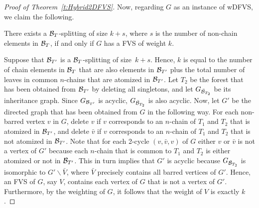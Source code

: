 \begin{proof}[Proof of Theorem~\ref{t:Hybrid2DFVS}]
Now, regarding $G$ as an instance of {\sc wDFVS}, we claim the following.

 There exists a ${\mathcal B}_T$-splitting of size $k+s$, where $s$ is the number of non-chain elements in ${\mathcal B}_T$, if and only if $G$ has a FVS of weight $k$.

{Suppose that ${\mathcal B}_{T'}$ is a ${\mathcal B}_T$-splitting of size~$k+s$. Hence, $k$ is equal to the number of chain elements in ${\mathcal B}_T$ that are also elements in ${\mathcal B}_{T'}$ plus the total number of leaves in common $n$-chains that are atomized in ${\mathcal B}_{T'}$. Let ${T_2}$ be the forest that has been obtained from ${\mathcal B}_{T'}$ by deleting all singletons, and let $G_{\bar{{\mathcal B}}_{T_2}}$ be its inheritance graph. Since $G_{{\mathcal B}_{T'}}$ is acyclic, $G_{\bar{{\mathcal B}}_{T_2}}$ is also acyclic. Now, let $G'$ be the directed graph that has been obtained from $G$ in the following way. For each non-barred vertex $v$ in $G$, delete $v$ if $v$ corresponds to an $n$-chain of $T_1$ and $T_2$ that is atomized in ${\mathcal B}_{T'}$, and delete $\bar{v}$ if $v$ corresponds to an $n$-chain of $T_1$ and $T_2$ that is not atomized in ${\mathcal B}_{T'}$}. Note that for each 2-cycle $(v,\bar{v},v)$ of $G$ either $v$ or $\bar{v}$ is not a vertex of $G'$ because each $n$-chain that is common to $T_1$ and $T_2$ is either atomized or not in ${\mathcal B}_{T'}$. {This 
in turn implies that $G'$ is acyclic because  $G_{\bar{{\mathcal B}}_{T_2}}$ is isomorphic to $G'\backslash \bar{V}$, where $\bar{V}$ precisely contains all barred vertices of $G'$. Hence, an FVS of $G$, say $V$, contains each vertex of $G$ that is not a vertex of $G'$. Furthermore, by the weighting of $G$, it follows that the weight of $V$ is exactly $k$.}


\end{proof}

